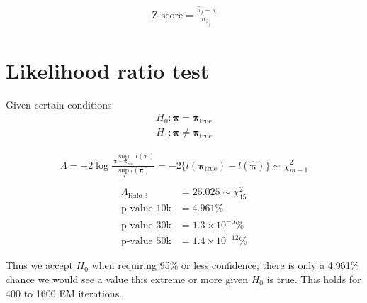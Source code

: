 \documentclass[12pt]{amsart}
\newcommand{\vect}[1]{\boldsymbol{\mathbf{#1}}}
\newcommand{\eqn}[1]{\begin{align*}
#1
\end{align*}}
\newcommand{\bl}{\big\{}
\newcommand{\br}{\big\}}
\newcommand{\vp}{\vect{\pi}}
\newcommand{\vph}{\hat{\vect{\pi}}}
\newcommand{\llp}{l(\vect{\pi})}
\begin{document}
\eqn{
	\text{Z-score} = \frac{\hat{\pi}_j - \pi}{\sigma_{\hat{\pi}_j}}
}
               
               
               
               

\clearpage
\section{Likelihood ratio test}
Given certain conditions
\eqn{
	H_0: \vp = \vp_\text{true}	\\
	H_1: \vp \neq \vp_\text{true}
}

\eqn{
	\Lambda = -2 \log \frac{ \sup_{\vp=\vp_\text{true}} \llp}{ \sup_{\vp} \llp }  = -2\bl l(\vp_\text{true}) - l(\vph) \br \sim \chi^2_{m-1}	\\
}
\eqn{
	\Lambda_\text{Halo 3} &= 25.025 \sim \chi^2_{15}	\\
	\text{p-value 10k} &= 4.961\%\\
	\text{p-value 30k} &= 1.3\times 10^{-5}\%\\
	\text{p-value 50k} &= 1.4\times 10^{-12}\%
}

Thus we accept $H_0$ when requiring 95\% or less confidence; there is only a 4.961\% chance we would see a value this extreme or more given $H_0$ is true. This holds for 400 to 1600 EM iterations.
\end{document}
